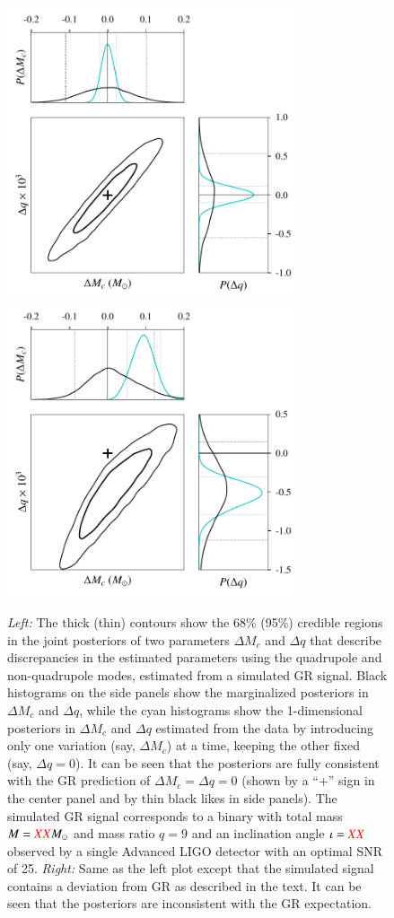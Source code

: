 \documentclass[prl,preprintnumbers,twocolumn,eqsecnum,floatfix,a4paper,nofootinbib,superscriptaddress]{revtex4}
\newcommand{\red}[1]{\textcolor{red}{#1}}
\begin{document}
\begin{figure}[htb] \begin{center}
\includegraphics[width=3.4in]{figs/fig1_GR.pdf}
\includegraphics[width=3.4in]{figs/fig1_modGR.pdf}
\caption{\emph{Left:} The thick (thin) contours show the 68\% (95\%) credible regions in the joint posteriors of two parameters $\Delta M_c$ and $\Delta q$ that describe discrepancies in the estimated parameters using the quadrupole and non-quadrupole modes, estimated from a simulated GR signal. Black histograms on the side panels show the marginalized posteriors in $\Delta M_c$ and $\Delta q$, while the cyan histograms show the 1-dimensional posteriors in $\Delta M_c$ and $\Delta q$ estimated from the data by introducing only one variation (say, $\Delta M_c$) at a time, keeping the other fixed (say, $\Delta q = 0$). It can be seen that the posteriors are fully consistent with the GR prediction of $\Delta M_c = \Delta q = 0$ (shown by a ``+'' sign in the center panel and by thin black likes in side panels).  The simulated GR signal corresponds to a binary with total mass $M = \red{XX}M_\odot$ and mass ratio $q = 9$ and an inclination angle $\iota = \red{XX}$ observed by a single Advanced LIGO detector with an optimal SNR of 25. \emph{Right:} Same as the left plot except that the simulated signal contains a deviation from GR as described in the text. It can be seen that the posteriors are inconsistent with the GR expectation.}
\label{fig:contour_plots}
\end{center} \end{figure}
\end{document}
